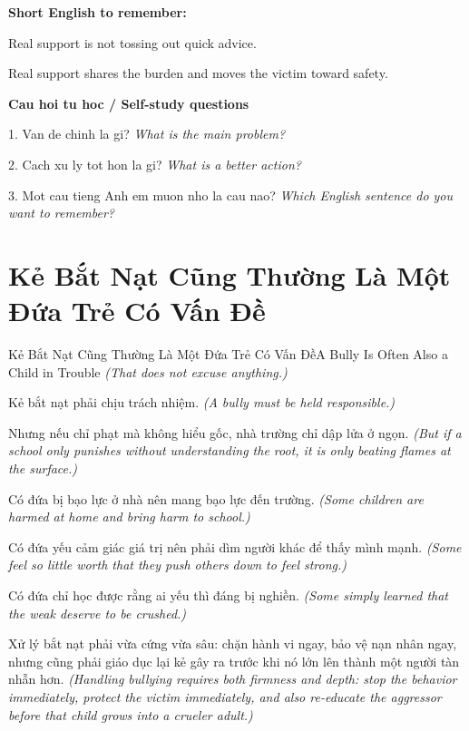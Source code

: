 \begin{ghinhoanh}
\textbf{Short English to remember:}

Real support is not tossing out quick advice.

Real support shares the burden and moves the victim toward safety.

\end{ghinhoanh}

\begin{tuhocnhanh}
\textbf{Cau hoi tu hoc / Self-study questions}

1. Van de chinh la gi? \textit{What is the main problem?}

2. Cach xu ly tot hon la gi? \textit{What is a better action?}

3. Mot cau tieng Anh em muon nho la cau nao? \textit{Which English sentence do you want to remember?}
\end{tuhocnhanh}
\ngancach

\section{Kẻ Bắt Nạt Cũng Thường Là Một Đứa Trẻ Có Vấn Đề}
\begin{truyen}{Kẻ Bắt Nạt Cũng Thường Là Một Đứa Trẻ Có Vấn Đề}{A Bully Is Often Also a Child in Trouble}
\textit{(That does not excuse anything.)}

Kẻ bắt nạt phải chịu trách nhiệm.
\textit{(A bully must be held responsible.)}

Nhưng nếu chỉ phạt mà không hiểu gốc, nhà trường chỉ dập lửa ở ngọn.
\textit{(But if a school only punishes without understanding the root, it is only beating flames at the surface.)}

Có đứa bị bạo lực ở nhà nên mang bạo lực đến trường.
\textit{(Some children are harmed at home and bring harm to school.)}

Có đứa yếu cảm giác giá trị nên phải dìm người khác để thấy mình mạnh.
\textit{(Some feel so little worth that they push others down to feel strong.)}

Có đứa chỉ học được rằng ai yếu thì đáng bị nghiền.
\textit{(Some simply learned that the weak deserve to be crushed.)}

Xử lý bắt nạt phải vừa cứng vừa sâu: chặn hành vi ngay, bảo vệ nạn nhân ngay, nhưng cũng phải giáo dục lại kẻ gây ra trước khi nó lớn lên thành một người tàn nhẫn hơn.
\textit{(Handling bullying requires both firmness and depth: stop the behavior immediately, protect the victim immediately, and also re-educate the aggressor before that child grows into a crueler adult.)}

\end{truyen}

